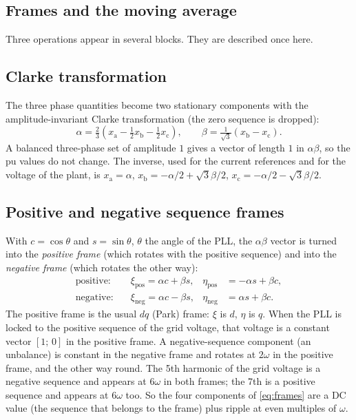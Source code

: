 \documentclass[11pt,a4paper]{scrartcl}
\newcommand{\ped}[1]{_{\mathrm{#1}}}
\begin{document}
\begin{onehalfspace}
\section{Frames and the moving average}
\label{sec:frames}

Three operations appear in several blocks. They are described once here.

\subsection{Clarke transformation}

The three phase quantities become two stationary components with the amplitude-invariant Clarke transformation (the zero sequence is dropped):
\begin{equation}
	\alpha = \tfrac{2}{3}\left(x\ped{a} - \tfrac{1}{2} x\ped{b} - \tfrac{1}{2} x\ped{c}\right), \qquad
	\beta  = \tfrac{1}{\sqrt{3}}\left(x\ped{b} - x\ped{c}\right).
	\label{eq:clarke}
\end{equation}
A balanced three-phase set of amplitude $1$ gives a vector of length $1$ in $\alpha\beta$, so the pu values do not change. The inverse, used for the current references and for the voltage of the plant, is $x\ped{a} = \alpha$, $x\ped{b} = -\alpha/2 + \sqrt{3}\beta/2$, $x\ped{c} = -\alpha/2 - \sqrt{3}\beta/2$.

\subsection{Positive and negative sequence frames}

With $c = \cos\theta$ and $s = \sin\theta$, $\theta$ the angle of the PLL, the $\alpha\beta$ vector is turned into the \emph{positive frame} (which rotates with the positive sequence) and into the \emph{negative frame} (which rotates the other way):
\begin{equation}
	\begin{aligned}
		\text{positive:}\quad & \xi\ped{pos} = \alpha c + \beta s,  & \eta\ped{pos} &= -\alpha s + \beta c, \\
		\text{negative:}\quad & \xi\ped{neg} = \alpha c - \beta s,  & \eta\ped{neg} &= \alpha s + \beta c.
	\end{aligned}
	\label{eq:frames}
\end{equation}
The positive frame is the usual $dq$ (Park) frame: $\xi$ is $d$, $\eta$ is $q$. When the PLL is locked to the positive sequence of the grid voltage, that voltage is a constant vector $[1;\,0]$ in the positive frame. A negative-sequence component (an unbalance) is constant in the negative frame and rotates at $2\omega$ in the positive frame, and the other way round. The 5th harmonic of the grid voltage is a negative sequence and appears at $6\omega$ in both frames; the 7th is a positive sequence and appears at $6\omega$ too. So the four components of \eqref{eq:frames} are a DC value (the sequence that belongs to the frame) plus ripple at even multiples of $\omega$.


\end{onehalfspace}
\end{document}
